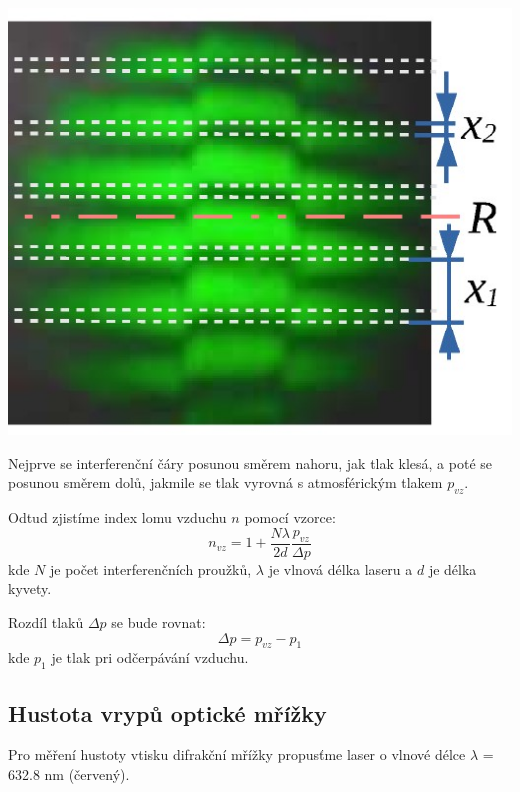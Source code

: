 \documentclass[a4paper,11pt]{article}
\begin{document}
    \begin{minipage}[t]{0.5\textwidth} 
            \vspace{0pt}   
            \par \centering
            \includegraphics[scale=0.5]{inter}
            \captionsetup{justification=centering, font=footnotesize}
            \label{fig:inter}
            \vspace{10pt}
            \raggedright
            \par Nejprve se interferenční čáry posunou směrem nahoru, jak tlak klesá, a poté se posunou směrem dolů, jakmile se tlak vyrovná s atmosférickým tlakem $p_{vz}$.
            \par Odtud zjistíme index lomu vzduchu $n$ pomocí vzorce: 
            \begin{equation}
                n_{vz} = 1 + \frac{N \lambda}{2d} \frac{p_{vz}}{\Delta p}
            \end{equation}
            kde $N$ je počet interferenčních proužků, $\lambda$ je vlnová délka laseru a $d$ je délka kyvety.
            \par Rozdíl tlaků $\Delta p$ se bude rovnat:
            \begin{equation}
                \Delta p = p_{vz} - p_1
            \end{equation}
            kde $p_1$ je tlak pri odčerpávání vzduchu.
        \subsection{Hustota vrypů optické mřížky}
            Pro měření hustoty vtisku difrakční mřížky propusťme laser o vlnové délce $\lambda$ = 632.8 nm (červený). 
    \end{minipage}
\end{document}
